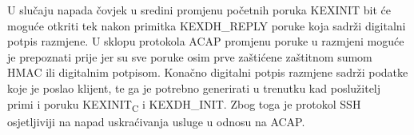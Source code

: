 U slučaju napada čovjek u sredini promjenu početnih poruka KEXINIT bit će moguće
otkriti tek nakon primitka KEXDH\_REPLY poruke koja sadrži digitalni potpis
razmjene. U sklopu protokola ACAP promjenu poruke u razmjeni moguće je
prepoznati prije jer su sve poruke osim prve zaštićene zaštitnom sumom HMAC ili
digitalnim potpisom.  Konačno digitalni potpis razmjene sadrži podatke koje je
poslao klijent, te ga je potrebno generirati u trenutku kad poslužitelj primi i
poruku KEXINIT\textsubscript{C} i KEXDH\_INIT. 
Zbog toga je protokol SSH osjetljiviji na napad uskraćivanja usluge u odnosu na
ACAP.

